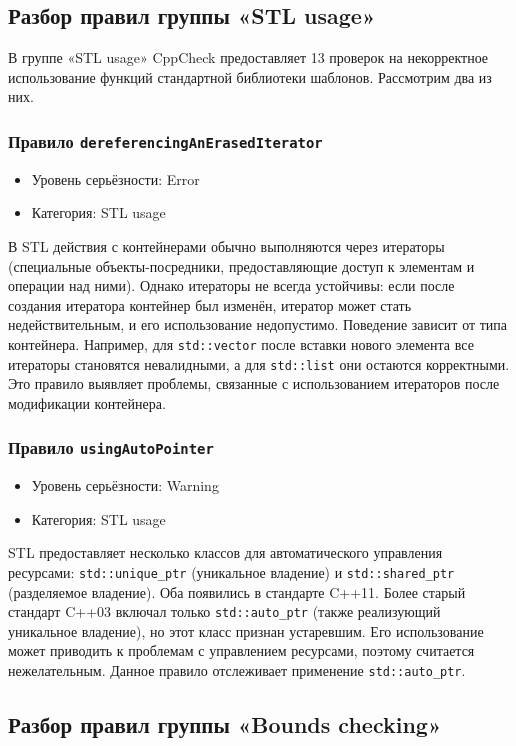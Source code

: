 \documentclass{article}[14pt]
\begin{document}
\subsection*{Разбор правил группы «STL usage»}

В группе «STL usage» CppCheck предоставляет 13 проверок на некорректное использование функций стандартной библиотеки шаблонов. 
Рассмотрим два из них.

\subsubsection*{Правило \texttt{dereferencingAnErasedIterator}}
\begin{itemize}
\item Уровень серьёзности: Error
\item Категория: STL usage
\end{itemize}
В STL действия с контейнерами обычно выполняются через итераторы (специальные объекты-посредники, предоставляющие доступ к 
элементам и операции над ними). Однако итераторы не всегда устойчивы: если после создания итератора контейнер был изменён, 
итератор может стать недействительным, и его использование недопустимо. Поведение зависит от типа контейнера. Например, для 
\texttt{std::vector} после вставки нового элемента все итераторы становятся невалидными, а для \texttt{std::list} они остаются 
корректными. Это правило выявляет проблемы, связанные с использованием итераторов после модификации контейнера.

\subsubsection*{Правило \texttt{usingAutoPointer}}
\begin{itemize}
\item Уровень серьёзности: Warning
\item Категория: STL usage
\end{itemize}
STL предоставляет несколько классов для автоматического управления ресурсами: \texttt{std::unique\_ptr} (уникальное владение) и 
\texttt{std::shared\_ptr} (разделяемое владение). Оба появились в стандарте C++11. Более старый стандарт C++03 включал только 
\texttt{std::auto\_ptr} (также реализующий уникальное владение), но этот класс признан устаревшим. Его использование может 
приводить к проблемам с управлением ресурсами, поэтому считается нежелательным. Данное правило отслеживает применение 
\texttt{std::auto\_ptr}.

\subsection*{Разбор правил группы «Bounds checking»}
\end{document}

